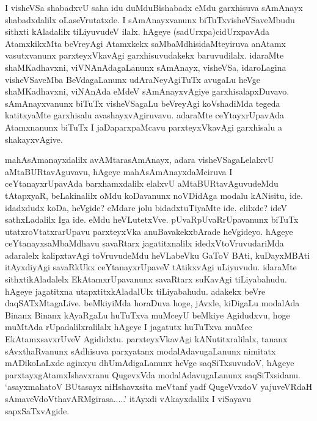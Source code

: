 \begin{artha}
I visheVSa shabadxvU saha idu duMduBishabadx eMdu garxhisuva sAmAnayx
shabadxdalilx oLaseVrutatxde. I sAmAnayxvanunx biTuTxvisheVSaveMbudu
sithxti kAladalilx tiLiyuvudeV ilalx. hAgeye (sadUrxpa)cidUrxpavAda
AtamxkikxMta beVreyAgi Atamxkekx saMbaMdhisidaMteyiruva anAtamx
vasutxvanunx parxteyxVkavAgi garxhisuvudakekx baruvudilalx. idaraMte
shaMKadhavxni, viVNAnAdagaLanunx sAmAnayx, visheVSa, idaroLagina
visheVSaveMba BeVdagaLanunx udAraNeyAgiTuTx avugaLu heVge
shaMKadhavxni, viNAnAda eMdeV sAmAnayxvAgiye
garxhisalapxDuvavo. sAmAnayxvanunx biTuTx visheVSagaLu beVreyAgi
koVshadiMda tegeda katitxyaMte garxhisalu avashayxvAgiruvavu. adaraMte
ceYtayxrUpavAda Atamxnanunx biTuTx I jaDaparxpaMcavu parxteyxVkavAgi
garxhisalu a shakayxvAgive.

mahAsAmanayxdalilx avAMtarasAmAnayx, adara visheVSagaLelalxvU
aMtaBURtavAguvavu, hAgeye mahAsAmAnayxdaMciruva I ceYtanayxrUpavAda
barxhamxdalilx elalxvU aMtaBURtavAguvudeMdu tAtapxyaR, beLakinalilx
oMdu koDavanunx noVDidAga modalu kANisitu, ide. idadxdudx koDa, heVgide?
eMdare jolu bidadxtuTiyaMte ide. elilxde? ideV sathxLadalilx Iga
ide. eMdu heVLutetxVve. pUvaRpUvaRrUpavanunx biTuTx
utatxroVtatxrarUpavu parxteyxVka anuBavakekxbArade heVgideyo. hAgeye
ceYtanayxsaMbaMdhavu savaRtarx jagatitxnalilx idedxVtoVruvudariMda
adaralelx kalipxtavAgi toVruvudeMdu heVLabeVku GaToV BAti, kuDayxMBAti
itAyxdiyAgi savaRkUkx ceYtanayxrUpaveV tAtikxvAgi uLiyuvudu. idaraMte
sithxtikAladalelx EkAtamxrUpavanunx savaRtarx suKavAgi
tiLiyabahudu. hAgeye jagatitxna utapxtitxkAladalUlx
tiLiyabahudu. adakekx beVre daqSATxMtagaLive. beMkiyiMda horaDuva
hoge, jAvxle, kiDigaLu modalAda Binanx Binanx kAyaRgaLu huTuTxva muMceyU
beMkiye Agidudxvu, hoge muMtAda rUpadalilxralilalx hAgeye I jagatutx
huTuTxva muMce EkAtamxsavxrUveV Agididxtu. parxteyxVkavAgi
kANutitxralilalx, tananx sAvxthaRvanunx sAdhisuva parxyatanx
modalAdavugaLanunx nimitatx mADikoLaLxde aginxyu dhUmAdigaLanunx heVge
saqSiTxsuvudoV, hAgeye parxtayxgAtamxIshavxranu QugevxVda
modalAdavugaLanunx saqSiTxsidanu. `asayxmahatoV BUtasayx niHshavxsita meVtanf yadf QugeVvxdoV yajuveVRdaH sAmaveVdoV\s thavARMgirasa.....' itAyxdi vAkayxdalilx I
viSayavu sapxSaTxvAgide.
\end{artha}

\centerline{}

